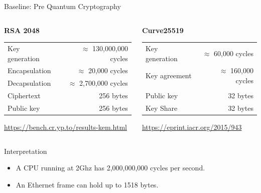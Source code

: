 \documentclass[xcolor=table,10pt,aspectratio=169]{beamer}
\begin{document}
\begin{frame}[label={sec:org89091eb}]{Baseline: Pre Quantum Cryptography}
\begin{columns}[t]
\begin{column}{0.5\columnwidth}
\textbf{RSA 2048}

\begin{center}
\begin{tabular}{lr}
Key generation & \(\approx\) 130,000,000 cycles\\
Encapsulation & \(\approx\) 20,000 cycles\\
Decapsulation & \(\approx\) 2,700,000 cycles\\
Ciphertext & 256 bytes\\
Public key & 256 bytes\\
\end{tabular}

\end{center}

\small \url{https://bench.cr.yp.to/results-kem.html}
\end{column}

\begin{column}{0.5\columnwidth}
\textbf{Curve25519}

\begin{center}
\begin{tabular}{lr}
Key generation & \(\approx\) 60,000 cycles\\
Key agreement & \(\approx\) 160,000 cycles\\
 & \\
Public key & 32 bytes\\
Key Share & 32 bytes\\
\end{tabular}

\end{center}

\small \url{https://eprint.iacr.org/2015/943}
\end{column}
\end{columns}


\begin{block}{Interpretation}
\begin{itemize}
\item A CPU running at 2Ghz has 2,000,000,000 cycles per second.
\item An Ethernet frame can hold up to 1518 bytes.
\end{itemize}
\end{block}
\end{frame}
\end{document}
